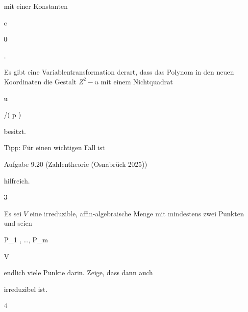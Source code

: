 {{{{    }{
}


{   }{
}


}
{}{}{}
mit einer Konstanten


\mavergleichskette


{\vergleichskette


{ c
}


{ \neq }{ 0
}


{  }{
}


{    }{
}


{   }{
}


}
{}{}{.}
}{Es gibt eine Variablentransformation derart, dass das Polynom in den neuen Koordinaten die Gestalt $Z^2-u$ mit einem Nichtquadrat


\mavergleichskette


{\vergleichskette


{ u
}


{ \in }{ \Z/( p )
}


{  }{
}


{    }{
}


{   }{
}


}
{}{}{}
besitzt.
}


}


{} {Tipp: Für einen wichtigen Fall ist

Aufgabe 9.20 (Zahlentheorie (Osnabrück 2025))

hilfreich.}




{3}


{


Es sei $V$ eine irreduzible, affin-algebraische Menge mit mindestens zwei Punkten und seien


\mavergleichskette


{\vergleichskette


{ P_1 , \ldots ,  P_m
}


{ \in }{ V
}


{  }{
}


{    }{
}


{   }{
}


}
{}{}{}
endlich viele Punkte darin. Zeige, dass dann auch


 {} {}
irreduzibel ist.


}


{} {}




{4}


